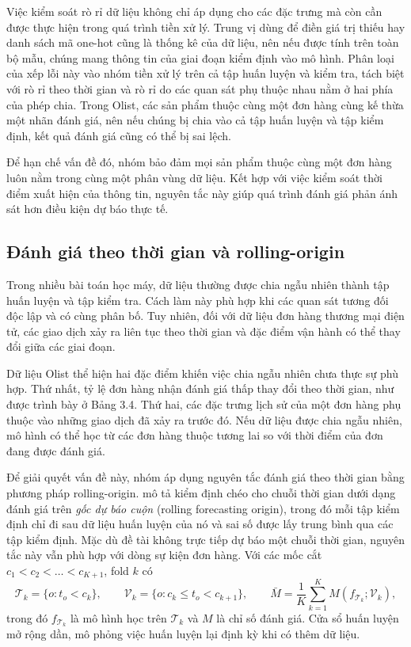 \documentclass[12pt,a4paper]{report}
\begin{document}
Việc kiểm soát rò rỉ dữ liệu không chỉ áp dụng cho các đặc trưng mà còn cần được thực hiện trong quá trình tiền xử lý.  Trung vị dùng để điền giá trị thiếu hay danh sách mã one-hot cũng là thống kê của dữ liệu, nên nếu được tính trên toàn bộ mẫu, chúng mang thông tin của giai đoạn kiểm định vào mô hình. Phân loại của \textcite{kapoor2023} xếp lỗi này vào nhóm tiền xử lý trên cả tập huấn luyện và kiểm tra, tách biệt với rò rỉ theo thời gian và rò rỉ do các quan sát phụ thuộc nhau nằm ở hai phía của phép chia. Trong Olist, các sản phẩm thuộc cùng một đơn hàng cùng kế thừa một nhãn đánh giá, nên nếu chúng bị chia vào cả tập huấn luyện và tập kiểm định, kết quả đánh giá cũng có thể bị sai lệch.

Để hạn chế vấn đề đó, nhóm bảo đảm mọi sản phẩm thuộc cùng một đơn hàng luôn nằm trong cùng một phân vùng dữ liệu. Kết hợp với việc kiểm soát thời điểm xuất hiện của thông tin, nguyên tắc này giúp quá trình đánh giá phản ánh sát hơn điều kiện dự báo thực tế.

\subsection{Đánh giá theo thời gian và rolling-origin}\label{sec:th-temporal}

Trong nhiều bài toán học máy, dữ liệu thường được chia ngẫu nhiên thành tập huấn luyện và tập kiểm tra. Cách làm này phù hợp khi các quan sát tương đối độc lập và có cùng phân bố. Tuy nhiên, đối với dữ liệu đơn hàng thương mại điện tử, các giao dịch xảy ra liên tục theo thời gian và đặc điểm vận hành có thể thay đổi giữa các giai đoạn.

Dữ liệu Olist thể hiện hai đặc điểm khiến việc chia ngẫu nhiên chưa thực sự phù hợp. Thứ nhất, tỷ lệ đơn hàng nhận đánh giá thấp thay đổi theo thời gian, như được trình bày ở Bảng 3.4. Thứ hai, các đặc trưng lịch sử của một đơn hàng phụ thuộc vào những giao dịch đã xảy ra trước đó. Nếu dữ liệu được chia ngẫu nhiên, mô hình có thể học từ các đơn hàng thuộc tương lai so với thời điểm của đơn đang được đánh giá.

Để giải quyết vấn đề này, nhóm áp dụng nguyên tắc đánh giá theo thời gian bằng phương pháp rolling-origin.  \textcite{hyndman2021} mô tả kiểm định chéo cho chuỗi thời gian dưới dạng đánh giá trên \emph{gốc dự báo cuộn} (rolling forecasting origin), trong đó mỗi tập kiểm định chỉ đi sau dữ liệu huấn luyện của nó và sai số được lấy trung bình qua các tập kiểm định. Mặc dù đề tài không trực tiếp dự báo một chuỗi thời gian, nguyên tắc này vẫn phù hợp với dòng sự kiện đơn hàng. Với các mốc cắt $c_1 < c_2 < \dots < c_{K+1}$, fold $k$ có
\begin{equation}\label{eq:th-rolling}
  \mathcal{T}_k = \{ o : t_o < c_k \}, \qquad
  \mathcal{V}_k = \{ o : c_k \le t_o < c_{k+1} \}, \qquad
  \bar{M} = \frac{1}{K} \sum_{k=1}^{K} M\!\left(f_{\mathcal{T}_k}; \mathcal{V}_k\right),
\end{equation}
trong đó $f_{\mathcal{T}_k}$ là mô hình học trên $\mathcal{T}_k$ và $M$ là chỉ số đánh giá. Cửa sổ huấn luyện mở rộng dần, mô phỏng việc huấn luyện lại định kỳ khi có thêm dữ liệu.
\end{document}
